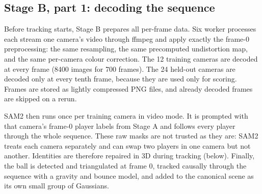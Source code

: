 \documentclass[11pt]{article}
\begin{document}
\subsection{Stage B, part 1: decoding the sequence}
Before tracking starts, Stage B prepares all per-frame data. Six worker processes each stream one
camera's video through ffmpeg and apply exactly the frame-0 preprocessing: the same resampling, the
same precomputed undistortion map, and the same per-camera colour correction. The 12 training
cameras are decoded at every frame (8400 images for 700 frames). The 24 held-out cameras are
decoded only at every tenth frame, because they are used only for scoring. Frames are stored as
lightly compressed PNG files, and already decoded frames are skipped on a rerun.

SAM2 then runs once per training camera in video mode. It is prompted with that camera's frame-0
player labels from Stage A and follows every player through the whole sequence. These raw masks
are not trusted as they are: SAM2 treats each camera separately and can swap two players in one
camera but not another. Identities are therefore repaired in 3D during tracking (below). Finally,
the ball is detected and triangulated at frame 0, tracked causally through the sequence with a
gravity and bounce model, and added to the canonical scene as its own small group of Gaussians.
\end{document}
